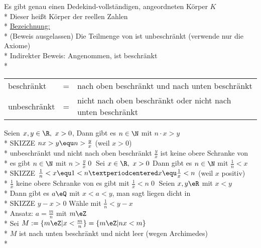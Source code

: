 \Satz
Es gibt genau einen Dedekind-vollständigen, angeordneten Körper $K$\\*
Dieser heißt Körper der reellen Zahlen\\*
\ul{Bezeichnung:} \R\\*
(Beweis ausgelassen)
%
\Satz
Die Teilmenge \N{} von \R{} ist unbeschränkt
\bew
(verwende nur die Axiome)\\*
Indirekter Beweis: Angenommen, \N{} ist beschränkt\\*
\begin{tabular}{lcl}
beschränkt &=& nach oben beschränkt und nach unten beschränkt\\*
unbeschränkt &=& nicht nach oben beschränkt oder nicht nach unten beschränkt
\end{tabular}
%
Seien $x,y\in\R,\ x>0$, Dann gibt es $n\in\N$ mit $n·x>y$\\*
SKIZZE %
%
\bew
$nx>y \equ n>\frac{y}{x}$ (weil $x>0$)\\*
\N{} unbeschränkt und nicht nach oben beschränkt \Rarr{} $\frac{y}{x}$ ist keine obere Schranke von \N\\*
\Rarr{} es gibt $n\in\N$ mit $n>\frac{y}{x}$\qed
%
Sei $x\in\R,\ x>0$ Dann gibt es $n\in\N$ mit $\frac{1}{n}<x$\\*
SKIZZE %
\bew
$\frac{1}{n}<x \equ 1<n·x \equ \frac{1}{x}<n$ (weil $x$ positiv)\\*
$\frac{1}{x}$ keine obere Schranke von \N{} \Rarr{} es gibt \nN{} mit $\frac{1}{x}<n$\qed
%
\Satz
Seien $x,y\eR$ mit $x<y$\\*
Dann gibt es $a\eQ$ mit $x<a<y$, man sagt \Q{} liegen dicht in \R\\*
SKIZZE %
\bew
$y-x>0$ Wähle \nN{} mit $\frac{1}{n}<y-x$\\*
Ansatz: $a=\frac{m}{n}$ mit $m\eZ$\\*
Sei $M:=\{m\eZ|x<\frac{m}{n}\}=\{m\eZ|nx<m\}$\\*
$M$ ist nach unten beschränkt und nicht leer (wegen Archimedes)\\*
